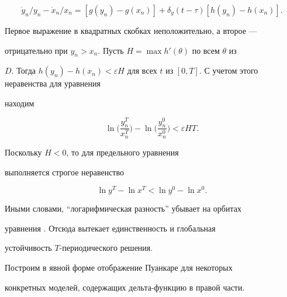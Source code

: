 \begin{pf}
$$


\Dot y_n/y_n-\Dot x_n/x_n=[g(y_n)-g(x_n)]+\delta_y(t-\tau)


[h(y_n)-h(x_n)].


$$


Первое выражение в квадратных скобках неположительно, а второе ---


отрицательно при $y_n>x_n$. Пусть $H=\max h'(\theta)$ по всем $\theta$ из 


$D$. Тогда $h(y_n)-h(x_n)<\varepsilon H$ для всех $t$ из $[0,


T]$. С учетом этого неравенства для уравнения 


 находим


$$


\ln\biggl(\frac{y_n^T}{x_n^T}\biggr)-


\ln\biggl(\frac{y_n^0}{x_n^0}\biggr)<\varepsilon HT.


$$


Поскольку $H<0$, то для предельного уравнения  


выполняется строгое неравенство


$$


\ln y^T-\ln x^T<\ln y^0-\ln x^0.


$$


Иными словами, ``логарифмическая разность'' убывает на орбитах


уравнения . Отсюда вытекает единственность и глобальная 


устойчивость $T$-периодического решения.


\end{pf}





Построим в явной форме отображение Пуанкаре для некоторых


конкретных моделей, содержащих дельта-функцию в правой части.





